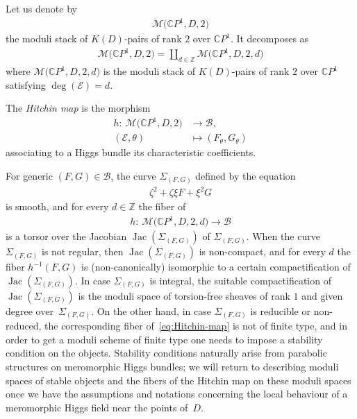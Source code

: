 \documentclass[10pt,a4paper]{amsart}
\newcommand{\Z}{{\mathbb Z}} %
\newcommand{\CP}[1]{\mathbb{C}P^{#1}} %
\newcommand{\E}{{\mathcal E}} %
\newcommand{\Mod}{{\mathcal M}} %
\numberwithin{equation}{section}
\begin{document}
Let us denote by
\begin{gather*}
 \Mod \big(\CP1, D, 2\big)
\end{gather*}
the moduli stack of $K(D)$-pairs of rank $2$ over $\CP1$. It decomposes as
\begin{gather*}%
 \Mod \big(\CP1, D, 2\big) = \coprod_{d\in\Z} \Mod \big(\CP1, D, 2, d\big)
\end{gather*}
where $\Mod \big(\CP1, D, 2, d\big)$ is the moduli stack of $K(D)$-pairs of rank $2$ over $\CP1$ satisfying $\deg (\E )\allowbreak = d$.
\begin{defn}\label{def:Hitchin_map}
 The {\it Hitchin map} is the morphism
 \begin{align*}
 h\colon \ \Mod \big(\CP1, D, 2\big) & \to \mathcal{B}, \\
 (\E ,\theta ) & \mapsto (F_{\theta}, G_{\theta})
 \end{align*}
 associating to a Higgs bundle its characteristic coefficients.
\end{defn}
For generic $(F,G) \in \mathcal{B}$, the curve $\Sigma_{(F,G)}$ defined by the equation
\begin{gather*}
 \zeta^2 + \zeta \xi F + \xi^2 G
\end{gather*}
is smooth, and for every $d\in \Z$ the fiber of
\begin{gather}\label{eq:Hitchin-map}
 h\colon \ \Mod \big(\CP1, D, 2, d\big) \to \mathcal{B}
\end{gather}
is a torsor over the Jacobian $\operatorname{Jac} (\Sigma_{(F,G)})$ of
$\Sigma_{(F,G)}$. When the curve $\Sigma_{(F,G)}$ is not regular, then
$\operatorname{Jac} (\Sigma_{(F,G)})$ is non-compact, and for every $d$ the fiber
$h^{-1} (F,G)$ is (non-canonically) isomorphic to a certain compactification
of $\operatorname{Jac} (\Sigma_{(F,G)})$. In case $\Sigma_{(F,G)}$ is integral,
the suitable compactifi\-cation of $\operatorname{Jac} (\Sigma_{(F,G)})$ is the
moduli space of torsion-free sheaves of rank $1$ and given degree over~$\Sigma_{(F,G)}$. On the other hand, in case $\Sigma_{(F,G)}$ is
reducible or non-reduced, the corresponding fiber of~\eqref{eq:Hitchin-map} is not
of finite type, and in order to get a moduli scheme of finite type one
needs to impose a stability condition on the objects. Stability
conditions naturally arise from parabolic structures on meromorphic
Higgs bundles; we will return to describing moduli spaces of stable
objects and the fibers of the Hitchin map on these moduli spaces once
we have the assumptions and notations concerning the local
behaviour of a meromorphic Higgs field near the points of~$D$.
\end{document}
